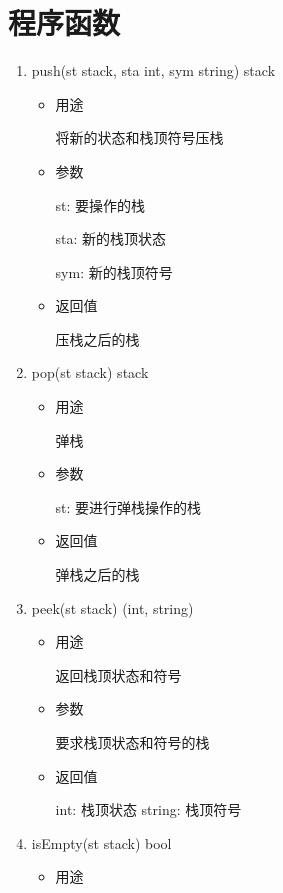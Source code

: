 \documentclass[fontset=none,UTF8,a4paper,zihao=-4]{ctexart}
\begin{document}
\section{程序函数}
\label{sec:orgc9dc469}
\begin{enumerate}
\item push(st stack, sta int, sym string) stack

\begin{itemize}
\item 用途

将新的状态和栈顶符号压栈

\item 参数

st: 要操作的栈

sta: 新的栈顶状态

sym: 新的栈顶符号

\item 返回值

压栈之后的栈
\end{itemize}

\item pop(st stack) stack

\begin{itemize}
\item 用途

弹栈

\item 参数

st: 要进行弹栈操作的栈

\item 返回值

弹栈之后的栈
\end{itemize}

\item peek(st stack) (int, string)

\begin{itemize}
\item 用途

返回栈顶状态和符号

\item 参数

要求栈顶状态和符号的栈

\item 返回值

int:    栈顶状态
string: 栈顶符号
\end{itemize}

\item isEmpty(st stack) bool

\begin{itemize}
\item 用途


\end{itemize}
\end{enumerate}
\end{document}
